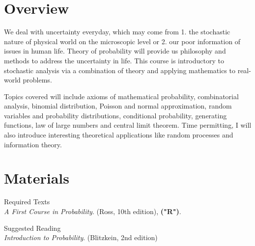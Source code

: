 \documentclass[letterpaper]{inzane_syllabus} %
\begin{document}

\makeprofile %

\section{Overview}
We deal with uncertainty everyday, which may come from 1. the stochastic nature of physical world on the microscopic level or 2. our poor information of issues in human life. Theory of probability will provide us philosophy and methods to address the uncertainty in life. This course is introductory to stochastic analysis via a combination of theory and applying mathematics to real-world problems.

Topics covered will include axioms of mathematical probability, combinatorial analysis, binomial distribution, Poisson and normal approximation, random variables and probability distributions, conditional probability, generating functions, law of large numbers and central limit theorem. Time permitting, I will also introduce interesting theoretical applications like random processes and information theory.

\vspace{0.5cm} %
\section{Materials}

{\color{myCOLOR} Required Texts}\\
\textit{A First Course in Probability}. (Ross, 10th edition), \textbf{({\color{myCOLOR}"R"})}. %

{\color{myCOLOR} Suggested Reading}\\
\textit{Introduction to Probability}. (Blitzkein, 2nd edition)
\end{document}
